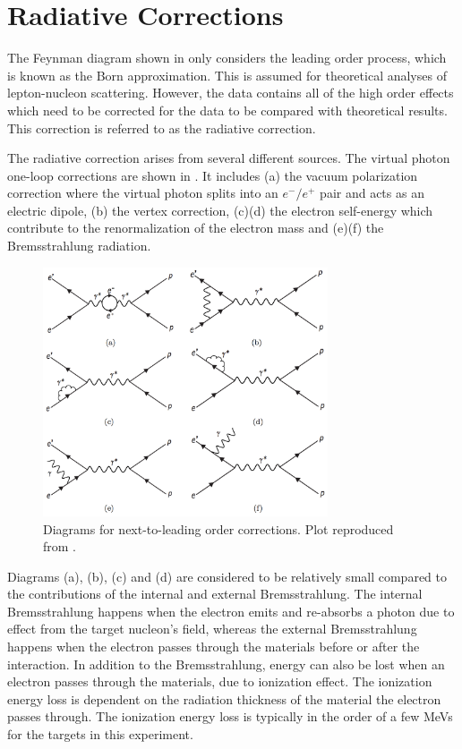 \section{Radiative Corrections}
\label{C8S2}

The Feynman diagram shown in  only considers the leading order process, which is known as the Born approximation. This is assumed for theoretical analyses of lepton-nucleon scattering. However, the data contains all of the high order effects which need to be corrected for the data to be compared with theoretical results. This correction is referred to as the radiative correction.

The radiative correction arises from several different sources. The virtual photon one-loop corrections are shown in . It includes (a) the vacuum polarization correction where the virtual photon splits into an $e^-/e^+$ pair and acts as an electric dipole, (b) the vertex correction, (c)(d) the electron self-energy which contribute to the renormalization of the electron mass and (e)(f) the Bremsstrahlung radiation.

\begin{figure}[tb!]
  \centering
  \includegraphics[width=0.75\textwidth]{figs/one-loop-corrections.png}
  \caption[Diagrams for next-to-leading order corrections.]{Diagrams for next-to-leading order corrections. Plot reproduced from \cite{Zielinski2014b}. \label{C8S2F1}}
\end{figure}

Diagrams (a), (b), (c) and (d) are considered to be relatively small compared to the contributions of the internal and external Bremsstrahlung. The internal Bremsstrahlung happens when the electron emits and re-absorbs a photon due to effect from the target nucleon's field, whereas the external Bremsstrahlung happens when the electron passes through the materials before or after the interaction. In addition to the Bremsstrahlung, energy can also be lost when an electron passes through the materials, due to ionization effect. The ionization energy loss is dependent on the radiation thickness of the material the electron passes through. The ionization energy loss is typically in the order of a few MeVs for the targets in this experiment.

